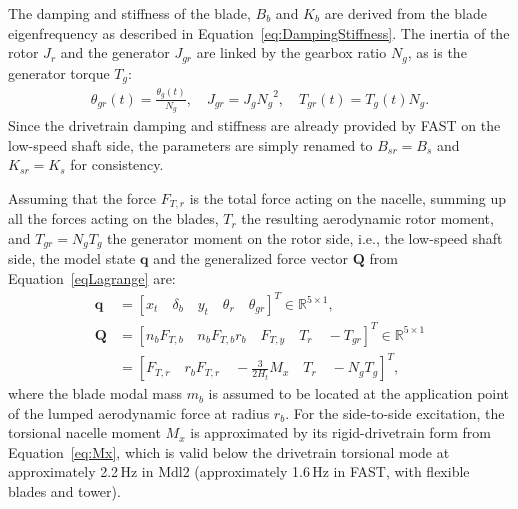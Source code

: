 The damping and stiffness of the blade, $B_b$ and $K_b$ are derived from the blade eigenfrequency as described in Equation~\eqref{eq:DampingStiffness}. %
The inertia of the rotor \(J_r\) and the generator \(J_{gr}\) are linked by the gearbox ratio \(N_g\), as is the generator torque \(T_g\):
\begin{align*}
    \theta_{gr}(t) = \frac{\theta_{g}(t)}{N_g}, \quad J_{gr} = J_{g}{N_g}^2,  \quad T_{gr}(t) = T_{g}(t)N_g. 
\end{align*}
Since the drivetrain damping and stiffness are already provided by FAST on the low-speed shaft side, the parameters are simply renamed to 
$B_{sr} = B_{s}$ and  $K_{sr} = K_{s}$ for consistency.

%
Assuming that the force \(F_{T,r}\) is the total force acting on the nacelle, summing up all the forces acting on the blades, $T_r$ the resulting aerodynamic rotor moment, and $T_{gr} = N_g T_g$ the generator moment on the rotor side, i.e., the low-speed shaft side, the model state \(\bm{q}\) and the generalized force vector \(\mathbf{Q}\) from Equation~\eqref{eqLagrange} are:
\begin{align*}
    \bm{q}& = [x_t \quad \delta_b \quad y_t \quad \theta_r \quad \theta_{gr}]^T  \in \mathbb{R}^{5 \times 1},\\
    \mathbf{Q} & = [n_b F_{T,b} \quad n_b F_{T,b}r_b \quad F_{T,y} \quad T_r \quad -T_{gr}]^T \in \mathbb{R}^{5 \times 1}\\
    & = \left[F_{T,r} \quad r_bF_{T,r} \quad -\tfrac{3}{2H_t}M_x\quad T_r \quad -N_g T_g\right]^T,
\end{align*}
where the blade modal mass $m_b$ is assumed to be located at the application point of the lumped aerodynamic force at radius $r_b$. For the side-to-side excitation, the torsional nacelle moment $M_x$ is approximated by its rigid-drivetrain form from Equation~\eqref{eq:Mx}, which is valid below the drivetrain torsional mode at approximately 2.2\,Hz in Mdl2 (approximately 1.6\,Hz in FAST, with flexible blades and tower).
    
